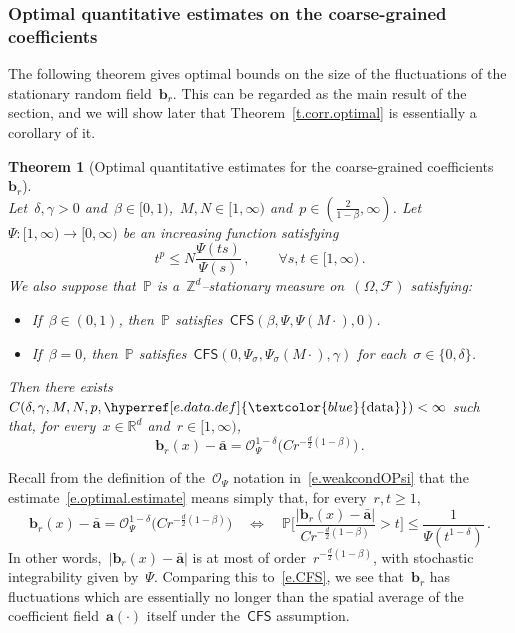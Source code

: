 \documentclass[11pt,twoside]{article} %
\numberwithin{equation}{section}
\newtheorem{theorem}{Theorem}[section]
\theoremstyle{definition}
\newcommand{\dataref}{\hyperref[e.data.def]{\textcolor{blue}{\ensuremath{\mathrm{data}}}}}
\newcommand*{\R}{\ensuremath{\mathbb{R}}}
\newcommand*{\Zd}{\ensuremath{\mathbb{Z}^d}}
\renewcommand{\b}{\ensuremath{\mathbf{b}}}
\renewcommand{\a}{\mathbf{a}}
\newcommand{\ahom}{\bar{\a}}
\newcommand{\F}{\mathcal{F}}
\renewcommand{\P}{\mathbb{P}}
\renewcommand{\O}{\mathcal{O}}
\newcommand{\CFS}{\mathsf{CFS}}
\begin{document}
\smallskip


\subsubsection{Optimal quantitative estimates on the coarse-grained coefficients}


The following theorem gives optimal bounds on the size of the fluctuations of the stationary random field~$\b_r$. 
This can be regarded as the main result of the section, and we will show later that Theorem~\ref{t.corr.optimal} is essentially a corollary of it. 

\begin{theorem}[Optimal quantitative estimates for the coarse-grained coefficients~$\b_r$]
\label{t.optimal}
\textbf{} \\
Let~$\delta,\gamma> 0$ and~$\beta \in [0,1)$,~$M, N \in [1,\infty)$ and~$p \in (\frac{2}{1-\beta},\infty)$.  
Let~$\Psi:[1,\infty) \to [0,\infty)$ be an increasing function satisfying
\begin{equation}  \label{e.Psi.pgrowth.theorem}
t^p \leq N \frac{\Psi(t s)}{\Psi(s)}\,,  
\qquad \forall s, t \in [1,\infty)
\,. 
\end{equation}
We also suppose that~$\P$ is a~$\Zd$--stationary measure on~$(\Omega,\F)$ satisfying: \begin{itemize}
\item If~$\beta \in (0,1)$, then~$\P$ satisfies~$\CFS(\beta,\Psi,\Psi(M\cdot),0)$.
\item If~$\beta = 0$, then~$\P$ satisfies~$\CFS(0,\Psi_\sigma,\Psi_\sigma(M\cdot),\gamma)$ for each~$\sigma \in \{0,\delta\}$.
\end{itemize}
Then there exists~$C(\delta,\gamma,M,N,p,\dataref) < \infty$ such that, for every~$x\in \R^d$ and~$r \in [1,\infty)$, 
\begin{equation} 
\label{e.optimal.estimate}
\b_{r}(x)  - \ahom  =  \O_{\Psi}^{1-\delta} \bigl(C r^{-\frac d2(1-\beta)}\bigr)
\,.
\end{equation}
\end{theorem}


Recall from the definition of the~$\O_\Psi$ notation in~\eqref{e.weakcondOPsi} that the estimate~\eqref{e.optimal.estimate} means simply that, for every~$r,t\geq 1$, 
\begin{equation} 
\label{e.optimal.estimate.Cheby}
\b_{r}(x)  - \ahom  =  \O_{\Psi}^{1-\delta} \bigl(C r^{-\frac d2(1-\beta)}\bigr) 
\quad \Longleftrightarrow \quad
\P \Biggl[ \frac{| \b_{r}(x)  - \ahom |}{Cr^{-\frac d2(1-\beta)}} > t \Biggr] 
\leq 
\frac{1}{\Psi(t^{1-\delta})}
\,.
\end{equation}
In other words,~$| \b_{r}(x)  - \ahom |$ is at most of order~$r^{-\frac d2(1-\beta)}$, with stochastic integrability given by~$\Psi$. Comparing this to~\eqref{e.CFS}, we see that~$\b_{r}$ has fluctuations which are essentially no longer than the spatial average of the coefficient field~$\a(\cdot)$ itself under the~$\CFS$ assumption.
\end{document}
